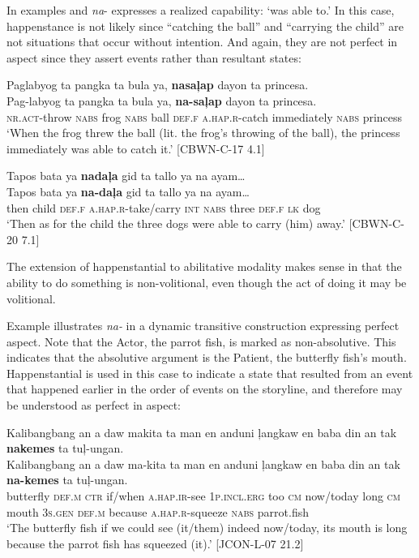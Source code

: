 In examples  and  \textit{na}{}- expresses a realized capability: ‘was able to.’ In this case, happenstance is not likely since “catching the ball” and “carrying the child” are not situations that occur without intention. And again, they are not perfect in aspect since they assert events rather than resultant states:

\ea
\label{bkm:Ref396387548}
Paglabyog  ta  pangka  ta  bula  ya,  \textbf{nasaļap}  dayon  ta  princesa. \\\smallskip
 \gll Pag-labyog  ta  pangka  ta  bula  ya,  \textbf{na-saļap}  dayon  ta  princesa. \\
\textsc{nr.act}-throw  \textsc{nabs} frog  \textsc{nabs} ball  \textsc{def.f}  \textsc{a.hap.r}-catch  immediately \textsc{nabs} princess \\
\glt `When the frog threw the ball (lit. the frog’s throwing of the ball), the princess immediately was able to catch it.’ [CBWN-C-17 4.1]
\z

\ea
\label{bkm:Ref119941722}
Tapos  bata  ya  \textbf{nadaļa}  gid  ta  tallo  ya  na  ayam… \\\smallskip
 \gll Tapos  bata  ya  \textbf{na-daļa}  gid  ta  tallo  ya  na  ayam… \\
then  child  \textsc{def.f}  \textsc{a.hap.r}-take/carry  \textsc{int}  \textsc{nabs}  three  \textsc{def.f}  \textsc{lk}  dog \\
\glt ‘Then as for the child the three dogs were able to carry (him) away.’ [CBWN-C-20 7.1]
\z

The extension of happenstantial to abilitative modality makes sense in that the ability to do something is non-volitional, even though the act of doing it may be volitional.

Example  illustrates \textit{na-} in a dynamic transitive construction expressing perfect aspect. Note that the Actor, the parrot fish, is marked as non-absolutive. This indicates that the absolutive argument is the Patient, the butterfly fish’s mouth. Happenstantial is used in this case to indicate a state that resulted from an event that happened earlier in the order of events on the storyline, and therefore may be understood as perfect in aspect:

\ea
\label{bkm:Ref392922782}
Kalibangbang  an  a  daw  makita  ta  man  en  anduni ļangkaw  en  baba  din  an  tak  \textbf{nakemes}  ta  tuļ{}-ungan. \\\smallskip
 \gll Kalibangbang  an  a  daw  ma-kita  ta  man  en  anduni ļangkaw  en  baba  din  an  tak  \textbf{na-kemes}  ta  tuļ{}-ungan. \\
butterfly  \textsc{def.m}  \textsc{ctr} if/when  \textsc{a.hap.ir}-see  1\textsc{p.incl.erg}  too  \textsc{cm} now/today
long  \textsc{cm}  mouth  3\textsc{s.gen}  \textsc{def.m}  because  \textsc{a.hap.r}-squeeze  \textsc{nabs} parrot.fish \\
\glt `The butterfly fish if we could see (it/them) indeed now/today, its mouth is long because the parrot fish has squeezed (it).’ [JCON-L-07 21.2]
\z

